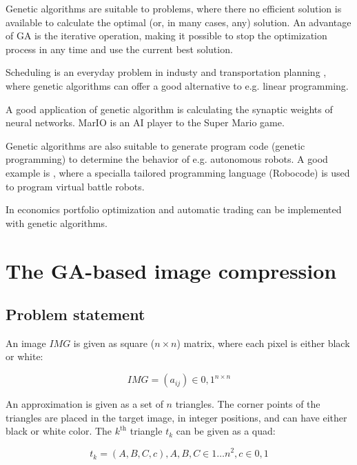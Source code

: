 \documentclass[conference]{IEEEtran}
\begin{document}
Genetic algorithms are suitable to problems, where
there no efficient solution is available to calculate
the optimal (or, in many cases, any) solution.
An advantage of GA is the iterative operation, making it possible
to stop the optimization process in any time and use the current
best solution.

Scheduling is an everyday problem in industy \cite{ga-scheduling}
and transportation planning \cite{ga-transport}, where genetic
algorithms can offer a good alternative to e.g. linear programming.

A good application of genetic algorithm is calculating
the synaptic weights of neural networks. MarIO \cite{mar-io}
is an AI player to the Super Mario game.

Genetic algorithms are also suitable to generate program code
(genetic programming) to determine the behavior of e.g.
autonomous robots. A good example is \cite{ga-robocode},
where a specialla tailored programming language (Robocode)
is used to program virtual battle robots.

In economics portfolio optimization \cite{ga-portfolio}
and automatic trading \cite{ga-trading}
can be implemented with genetic algorithms.

\cite{image-proc}

\section{The GA-based image compression}

\subsection{Problem statement}

An image $IMG$ is given as square ($n \times n$) matrix, where each pixel is
either black or white:

\begin{equation}
	IMG = (a_{ij}) \in {0,1}^{n \times n}
\end{equation}

An approximation is given as a set of $n$ triangles. The corner points of
the triangles are placed in the target image, in integer positions,
and can have either black or white color. The $k^\text{th}$ triangle
$t_k$ can be given as a quad:

\begin{equation}
	t_k = (A, B, C, c), A, B, C \in {1 \dots n}^2, c \in {0, 1}
\end{equation}
\end{document}

